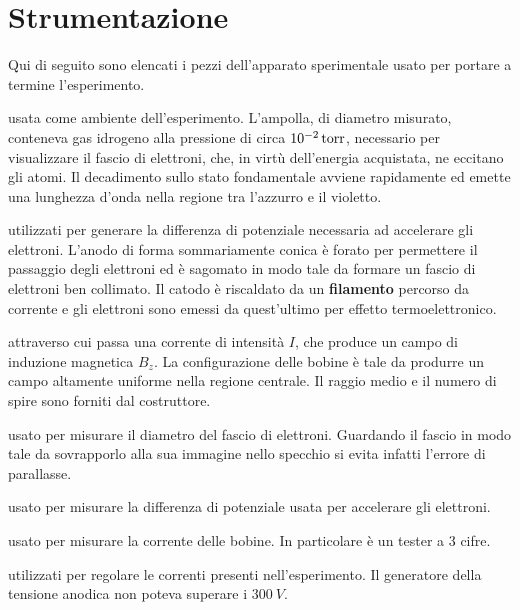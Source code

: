 \documentclass[a4paper,11pt]{article}
\begin{document}
	
	\section{Strumentazione}
	
	Qui di seguito sono elencati i pezzi dell'apparato sperimentale usato per portare a termine l'esperimento.
	\begin{description}[align=left]
	
		\item [Ampolla di vetro] usata come ambiente dell'esperimento. L'ampolla, di diametro misurato, conteneva gas idrogeno alla pressione di circa $\SI{E-2}{torr}$, necessario per visualizzare il fascio di elettroni, che, in virtù dell'energia acquistata, ne eccitano gli atomi. Il decadimento sullo stato fondamentale avviene rapidamente ed emette una lunghezza d'onda nella regione tra l'azzurro e il violetto.
		
		\item [Due elettrodi] utilizzati per generare la differenza di potenziale necessaria ad accelerare gli elettroni. L'anodo di forma sommariamente conica è forato per permettere il passaggio degli elettroni ed è sagomato in modo tale da formare un fascio di elettroni ben collimato. Il catodo è riscaldato da un \textbf{filamento} percorso da corrente e gli elettroni sono emessi da quest'ultimo per effetto termoelettronico.
		
		\item [Due bobine di Helmholtz] attraverso cui passa una corrente di intensità $I$, che produce un campo di induzione magnetica $B _z$. La configurazione delle bobine è tale da produrre un campo altamente uniforme nella regione centrale. Il raggio medio e il numero di spire sono forniti dal costruttore.
		
		\item [Specchio] usato per misurare il diametro del fascio di elettroni. Guardando il fascio in modo tale da sovrapporlo alla sua immagine nello specchio si evita infatti l'errore di parallasse.
		
		\item [Un voltametro] usato per misurare la differenza di potenziale usata per accelerare gli elettroni.
		
		\item [Un amperometro] usato per misurare la corrente delle bobine. In particolare è un tester a 3 cifre.
		
		\item [Opportuni trasformatori] utilizzati per regolare le correnti presenti nell'esperimento. Il generatore della tensione anodica non poteva superare i $\SI{300}{V}$.
		

\end{description}
\end{document}

